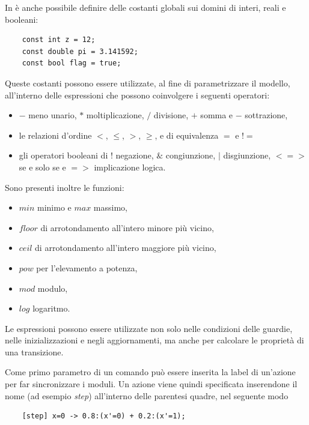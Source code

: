 In \prism{} è anche possibile definire delle costanti globali sui domini di interi, reali e booleani:
\begin{verbatim}
	const int z = 12;
	const double pi = 3.141592;
	const bool flag = true;
\end{verbatim}
Queste costanti possono essere utilizzate, al fine di parametrizzare il modello, all'interno delle espressioni che possono coinvolgere i seguenti operatori:
\begin{itemize}
	\item $-$ meno unario, $*$ moltiplicazione, $\slash$ divisione, $+$ somma e $-$ sottrazione,
	\item le relazioni d'ordine $<$, $\leq$, $>$, $\geq$, e di equivalenza $=$ e $!=$
	\item gli operatori booleani di $!$ negazione, $\&$ congiunzione, $|$ disgiunzione, $<=>$ se e solo se e $=>$ implicazione logica.
\end{itemize}
Sono presenti inoltre le funzioni:
\begin{itemize}
	\item $min$ minimo e $max$ massimo,
	\item $floor$ di arrotondamento all'intero minore più vicino,
	\item $ceil$ di arrotondamento all'intero maggiore più vicino,
	\item $pow$ per l'elevamento a potenza,
	\item $mod$ modulo,
	\item $log$ logaritmo.
\end{itemize}
Le espressioni possono essere utilizzate non solo nelle condizioni delle guardie, nelle inizializzazioni e negli aggiornamenti, ma anche per calcolare le proprietà di una transizione.

Come primo parametro di un comando può essere inserita la label di un'azione per far sincronizzare i moduli. Un azione viene quindi specificata inserendone il nome (ad esempio \emph{step}) all'interno delle parentesi quadre, nel seguente modo
\begin{verbatim}
	[step] x=0 -> 0.8:(x'=0) + 0.2:(x'=1);
\end{verbatim}

